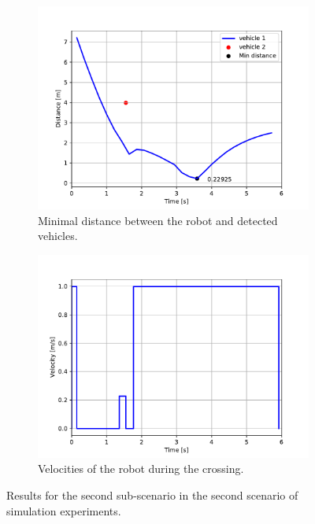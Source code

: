            \begin{figure}[H]
                \centering
                \begin{subfigure}{0.49\linewidth}
                    \centering
                    \includegraphics[trim={24 8 40 41}, clip, width=\linewidth]{images/simulations/scene2_2_dist.pdf}
                    \caption{Minimal distance between the robot and detected vehicles.}
                \end{subfigure}
                \begin{subfigure}{0.49\linewidth}
                    \centering
                    \includegraphics[trim={21 8 40 41}, clip, width=\linewidth]{images/simulations/scene2_2_vel.pdf}
                    \caption{Velocities of the robot during the crossing.}
                \end{subfigure}
                \caption{Results for the second sub-scenario in the second scenario of simulation experiments.}
                \label{fig:scene2_2_graphs}
            \end{figure}
